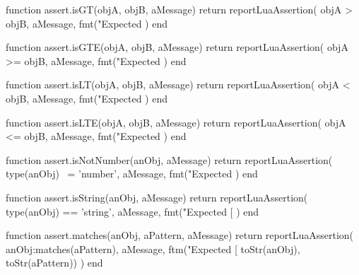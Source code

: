 \stopTestSuite


\startLuaCode
function assert.isGT(objA, objB, aMessage)
  return reportLuaAssertion(
    objA > objB,
    aMessage,
    fmt("Expected %
  )
end
\stopLuaCode

\stopTestSuite


\startLuaCode
function assert.isGTE(objA, objB, aMessage)
  return reportLuaAssertion(
    objA >= objB,
    aMessage,
    fmt("Expected %
  )
end
\stopLuaCode

\stopTestSuite


\startLuaCode
function assert.isLT(objA, objB, aMessage)
  return reportLuaAssertion(
    objA < objB,
    aMessage,
    fmt("Expected %
  )
end
\stopLuaCode

\stopTestSuite


\startLuaCode
function assert.isLTE(objA, objB, aMessage)
  return reportLuaAssertion(
    objA <= objB,
    aMessage,
    fmt("Expected %
  )
end
\stopLuaCode


\stopTestSuite


\startLuaCode
function assert.isNotNumber(anObj, aMessage)
  return reportLuaAssertion(
    type(anObj) ~= 'number',
    aMessage,
    fmt("Expected %
  )
end
\stopLuaCode

\stopTestSuite


\startLuaCode
function assert.isString(anObj, aMessage)
  return reportLuaAssertion(
    type(anObj) == 'string',
    aMessage,
    fmt("Expected [%
  )
end
\stopLuaCode

\stopTestSuite


\startLuaCode
function assert.matches(anObj, aPattern, aMessage)
  return reportLuaAssertion(
    anObj:matches(aPattern),
    aMessage,
    ftm("Expected [%
      toStr(anObj), toStr(aPattern))
  )
end
\stopLuaCode


